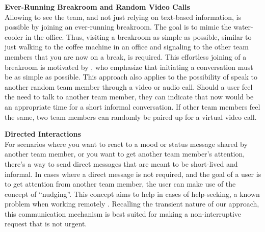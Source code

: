 \medskip\noindent\textbf{Ever-Running Breakroom and Random Video Calls} \\
Allowing to see the team, and not just relying on text-based information, is possible by joining an ever-running breakroom. The goal is to mimic the water-cooler in the office. Thus, visiting a breakroom as simple as possible, similar to just walking to the coffee machine in an office and signaling to the other team members that you are now on a break, is required. This effortless joining of a breakroom is motivated by \textcite{chang2007out}, who emphasize that initiating a conversation must be as simple as possible. This approach also applies to the possibility of speak to another random team member through a video or audio call. Should a user feel the need to talk to another team member, they can indicate that now would be an appropriate time for a short informal conversation. If other team members feel the same, two team members can randomly be paired up for a virtual video call.

\medskip\noindent\textbf{Directed Interactions} \\
For scenarios where you want to react to a mood or status message shared by another team member, or you want to get another team member's attention, there's a way to send direct messages that are meant to be short-lived and informal. In cases where a direct message is not required, and the goal of a user is to get attention from another team member, the user can make use of the concept of \enquote{nudging}. This concept aims to help in cases of help-seeking, a known problem when working remotely \autocite{herbsleb2003empirical}. Recalling the transient nature of our approach, this communication mechanism is best suited for making a non-interruptive request that is not urgent.
